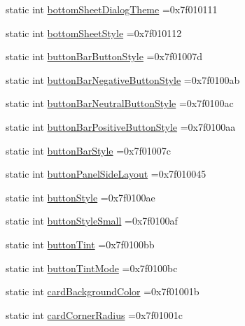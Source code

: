 \begin{DoxyCompactItemize}
\item 
static int \hyperlink{classandroid_1_1support_1_1v4_1_1R_1_1attr_a5d2141f05a94ea6df7aa87c76d4c1613}{bottom\+Sheet\+Dialog\+Theme} =0x7f010111
\item 
static int \hyperlink{classandroid_1_1support_1_1v4_1_1R_1_1attr_a669cde3e095c7754856eca842274e111}{bottom\+Sheet\+Style} =0x7f010112
\item 
static int \hyperlink{classandroid_1_1support_1_1v4_1_1R_1_1attr_a54c7f8bd105cdf2413596e8264b907c6}{button\+Bar\+Button\+Style} =0x7f01007d
\item 
static int \hyperlink{classandroid_1_1support_1_1v4_1_1R_1_1attr_ab49f2526f5dcee871d94e0c224825433}{button\+Bar\+Negative\+Button\+Style} =0x7f0100ab
\item 
static int \hyperlink{classandroid_1_1support_1_1v4_1_1R_1_1attr_a67442feaeed5f77a8c983a06db98cbac}{button\+Bar\+Neutral\+Button\+Style} =0x7f0100ac
\item 
static int \hyperlink{classandroid_1_1support_1_1v4_1_1R_1_1attr_a777a1df76dd19b37852b5b0b343933dc}{button\+Bar\+Positive\+Button\+Style} =0x7f0100aa
\item 
static int \hyperlink{classandroid_1_1support_1_1v4_1_1R_1_1attr_ab6043a58f9feddd5e50a5dff20e3c18c}{button\+Bar\+Style} =0x7f01007c
\item 
static int \hyperlink{classandroid_1_1support_1_1v4_1_1R_1_1attr_a7307a34f07a4a79b917e25e56bc4047d}{button\+Panel\+Side\+Layout} =0x7f010045
\item 
static int \hyperlink{classandroid_1_1support_1_1v4_1_1R_1_1attr_aa24d1272610cc52a96b5b53bcd08e9a7}{button\+Style} =0x7f0100ae
\item 
static int \hyperlink{classandroid_1_1support_1_1v4_1_1R_1_1attr_a1d9fea4ceb03e8088fdb83e6d77cc643}{button\+Style\+Small} =0x7f0100af
\item 
static int \hyperlink{classandroid_1_1support_1_1v4_1_1R_1_1attr_a68ad5bf40f3267e918dbf536fd164b52}{button\+Tint} =0x7f0100bb
\item 
static int \hyperlink{classandroid_1_1support_1_1v4_1_1R_1_1attr_a7ad1fc4f5ce03f5edd37110e460fdf1c}{button\+Tint\+Mode} =0x7f0100bc
\item 
static int \hyperlink{classandroid_1_1support_1_1v4_1_1R_1_1attr_acf5b55e359835fbeba6ee324667289c7}{card\+Background\+Color} =0x7f01001b
\item 
static int \hyperlink{classandroid_1_1support_1_1v4_1_1R_1_1attr_a6a6c34d8de2d1debea95fc7926cbc269}{card\+Corner\+Radius} =0x7f01001c
\item 

\end{DoxyCompactItemize}
